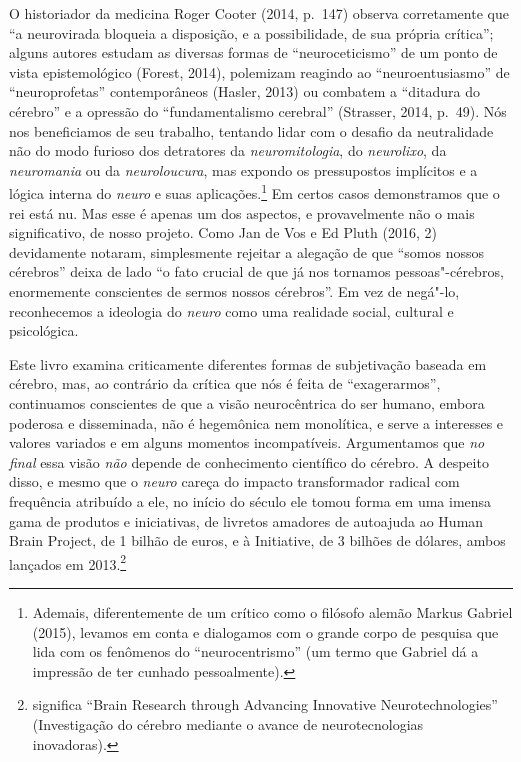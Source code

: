 O historiador da medicina Roger Cooter (2014, p.~147) observa
corretamente que ``a neurovirada bloqueia a disposição, e a
possibilidade, de sua própria crítica''; alguns autores estudam as
diversas formas de ``neuroceticismo'' de um ponto de vista
epistemológico (Forest, 2014), polemizam reagindo ao ``neuroentusiasmo''
de ``neuroprofetas'' contemporâneos (Hasler, 2013) ou combatem a
``ditadura do cérebro'' e a opressão do ``fundamentalismo cerebral''
(Strasser, 2014, p.~49). Nós nos beneficiamos de seu trabalho, tentando
lidar com o desafio da neutralidade não do modo furioso dos detratores
da \emph{neuromitologia}, do \emph{neurolixo}, da \emph{neuromania} ou
da \emph{neuroloucura}, mas expondo os pressupostos implícitos e a
lógica interna do \emph{neuro} e suas aplicações.\footnote[2]{Ademais, diferentemente de um crítico como o filósofo alemão Markus
Gabriel (2015), levamos em conta e dialogamos com o grande corpo de
pesquisa que lida com os fenômenos do ``neurocentrismo'' (um termo que
Gabriel dá a impressão de ter cunhado pessoalmente).} Em
certos casos demonstramos que o rei está nu. Mas esse é apenas um dos
aspectos, e provavelmente não o mais significativo, de nosso projeto.
Como Jan de Vos e Ed Pluth (2016, 2) devidamente notaram, simplesmente
rejeitar a alegação de que ``somos nossos cérebros'' deixa de lado ``o
fato crucial de que já nos tornamos pessoas"-cérebros, enormemente
conscientes de sermos nossos cérebros''. Em vez de negá"-lo, reconhecemos
a ideologia do \emph{neuro} como uma realidade social, cultural e
psicológica.

Este livro examina criticamente diferentes formas de subjetivação
baseada em cérebro, mas, ao contrário da crítica que nós é feita de
``exagerarmos'', continuamos conscientes de que a visão neurocêntrica do
ser humano, embora poderosa e disseminada, não é hegemônica nem
monolítica, e serve a interesses e valores variados e em alguns momentos
incompatíveis. Argumentamos que \emph{no final} essa visão \emph{não}
depende de conhecimento científico do cérebro. A despeito disso, e mesmo
que o \emph{neuro} careça do impacto transformador radical com
frequência atribuído a ele, no início do século  ele tomou forma em
uma imensa gama de produtos e iniciativas, de livretos amadores de
autoajuda ao Human Brain Project, de 1 bilhão de euros, e à 
Initiative, de 3 bilhões de dólares, ambos lançados em
2013.\footnote[3]{ significa ``Brain Research through Advancing Innovative
Neurotechnologies'' (Investigação do cérebro mediante o avance de
neurotecnologias inovadoras).}

